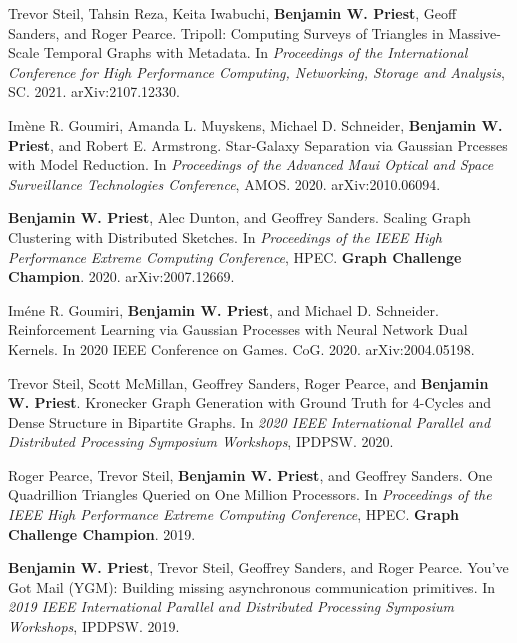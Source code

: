 \item Trevor Steil, Tahsin Reza, Keita Iwabuchi, \textbf{Benjamin W. Priest}, Geoff Sanders, and Roger Pearce.
	Tripoll: Computing Surveys of Triangles in Massive-Scale Temporal Graphs with Metadata.
	In \emph{Proceedings of the International Conference for High Performance Computing, Networking, Storage and Analysis},
	SC. 
	2021.
	arXiv:2107.12330.

\item Im\`ene R. Goumiri, Amanda L. Muyskens, Michael D. Schneider, \textbf{Benjamin W. Priest}, and Robert E. Armstrong.
	Star-Galaxy Separation via Gaussian Prcesses with Model Reduction.
	In \emph{Proceedings of the Advanced Maui Optical and Space Surveillance Technologies Conference},
	AMOS.
	2020.
	arXiv:2010.06094.

\item \textbf{Benjamin W. Priest}, Alec Dunton, and Geoffrey Sanders.
	Scaling Graph Clustering with Distributed Sketches.
	In \emph{Proceedings of the IEEE High Performance Extreme Computing Conference}, 
	HPEC. 
	\textbf{Graph Challenge Champion}.
	2020.
	arXiv:2007.12669.

\item Im\'{e}ne R. Goumiri, \textbf{Benjamin W. Priest}, and Michael D. Schneider.
	Reinforcement Learning via Gaussian Processes with Neural Network Dual Kernels.
	In 2020 IEEE Conference on Games.
	CoG.
	2020.
	arXiv:2004.05198.

\item Trevor Steil, Scott McMillan, Geoffrey Sanders, Roger Pearce, and \textbf{Benjamin W. Priest}.
	Kronecker Graph Generation with Ground Truth for 4-Cycles and Dense Structure in Bipartite Graphs.
	In \emph{2020 IEEE International Parallel and Distributed Processing Symposium Workshops}, 
	IPDPSW. 
	2020.

\item Roger Pearce, Trevor Steil, \textbf{Benjamin W. Priest}, and Geoffrey Sanders.
	One Quadrillion Triangles Queried on One Million Processors.
	In \emph{Proceedings of the IEEE High Performance Extreme Computing Conference}, 
	HPEC. 
	\textbf{Graph Challenge Champion}.
	2019.

\item \textbf{Benjamin W. Priest}, Trevor Steil, Geoffrey Sanders, and Roger Pearce.
	You've {G}ot {M}ail (YGM): Building missing asynchronous communication primitives.
	In \emph{2019 IEEE International Parallel and Distributed Processing Symposium Workshops}, 
	IPDPSW. 
	2019.

